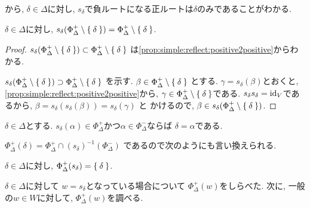 から,
$\delta\in\Delta$に対し,
$s_\delta$で負ルートになる正ルートは$\delta$のみであることがわかる.
\begin{cor}
  $\delta\in\Delta$に対し,
  $s_\delta(\Phi_\Delta^+\setminus\Set{\delta})=\Phi_\Delta^+\setminus\Set{\delta}$.
\end{cor}
\begin{proof}
$s_\delta(\Phi_\Delta^+\setminus\Set{\delta})\subset\Phi_\Delta^+\setminus\Set{\delta}$
は\cref{prop:simple:reflect:positive2positive}からわかる.

$s_\delta(\Phi_\Delta^+\setminus\Set{\delta})\supset\Phi_\Delta^+\setminus\Set{\delta}$
を示す.
$\beta\in\Phi_\Delta^+\setminus\Set{\delta}$
とする.
$\gamma=s_\delta(\beta)$とおくと,
\cref{prop:simple:reflect:positive2positive}から,
$\gamma\in \Phi_\Delta^+\setminus\Set{\delta}$である.
$s_\delta s_\delta=\operatorname{id}_V$であるから,
$\beta=s_\delta(s_\delta(\beta))=s_\delta(\gamma)$
と
かけるので, $\beta\in s_\delta(\Phi_\Delta^+\setminus\Set{\delta})$.
\end{proof}
\begin{cor}
  \label{thm:simple:action:x}
  $\delta\in\Delta$とする.
  $s_\delta(\alpha)\in\Phi_\Delta^+$かつ$\alpha\in\Phi_\Delta^-$ならば
  $\delta=\alpha$である.
\end{cor}
$\Phi_\Delta^{+}(\delta)=\Phi_\Delta^+\cap (s_\delta)^{-1}(\Phi_\Delta^-)$
であるので次のようにも言い換えられる.
\begin{cor}
  $\delta\in\Delta$に対し,
  $\Phi_\Delta^{+}(s_\delta)=\Set{\delta}$.
\end{cor}

$\delta\in\Delta$に対して
$w=s_\delta$となっている場合について $\Phi_\Delta^+(w)$をしらべた.
次に, 一般の$w\in W$に対して,
$\Phi_\Delta^+(w)$を調べる.

